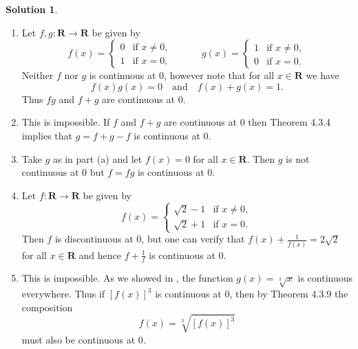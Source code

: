 \documentclass[12pt]{article}
\theoremstyle{definition}
\theoremstyle{exercise}
\theoremstyle{solution}
\newtheorem*{solution}{Solution}
\newcommand{\quand}{\quad \text{and} \quad}
\newcommand{\R}{\mathbf{R}}
\begin{document}
\begin{solution}
    \begin{enumerate}
        \item Let \( f, g : \R \to \R \) be given by
        \[
            f(x) = \begin{cases}
                0 & \text{if } x \neq 0, \\
                1 & \text{if } x = 0,
            \end{cases}
            \quad\quad\quad
            g(x) = \begin{cases}
                1 & \text{if } x \neq 0, \\
                0 & \text{if } x = 0.
            \end{cases}
        \]
        Neither \( f \) nor \( g \) is continuous at 0, however note that for all \( x \in \R \) we have
        \[
            f(x)g(x) = 0 \quand f(x) + g(x) = 1.
        \]
        Thus \( fg \) and \( f + g \) are continuous at 0.

        \item This is impossible. If \( f \) and \( f + g \) are continuous at 0 then Theorem 4.3.4 implies that \( g = f + g - f \) is continuous at 0.

        \item Take \( g \) as in part (a) and let \( f(x) = 0 \) for all \( x \in \R \). Then \( g \) is not continuous at 0 but \( f = fg \) is continuous at 0.

        \item Let \( f : \R \to \R \) be given by
        \[
            f(x) = \begin{cases}
                \sqrt{2} - 1 & \text{if } x \neq 0, \\
                \sqrt{2} + 1 & \text{if } x = 0.
            \end{cases}
        \]
        Then \( f \) is discontinuous at 0, but one can verify that \( f(x) + \tfrac{1}{f(x)} = 2 \sqrt{2} \) for all \( x \in \R \) and hence \( f + \tfrac{1}{f} \) is continuous at 0.

        \item This is impossible. As we showed in , the function \( g(x) = \sqrt[3]{x} \) is continuous everywhere. Thus if \( [f(x)]^3 \) is continuous at 0, then by Theorem 4.3.9 the composition
        \[
            f(x) = \sqrt[3]{[f(x)]^3}
        \]
        must also be continuous at 0.
    \end{enumerate}
\end{solution}
\end{document}

